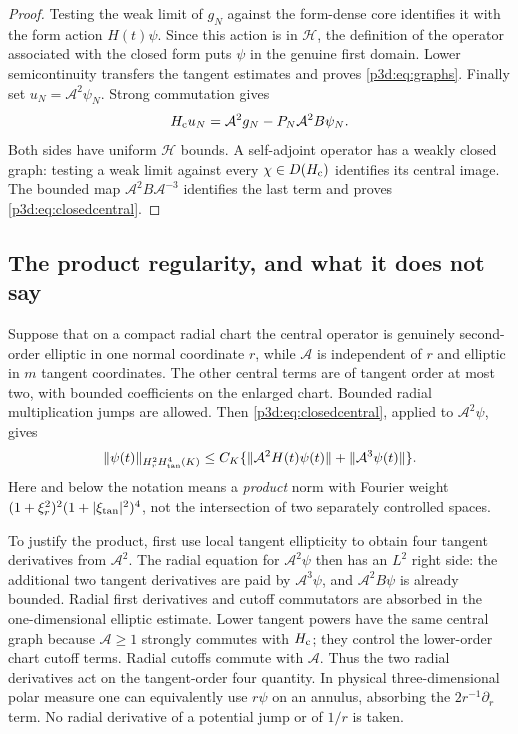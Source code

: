 \documentclass[11pt]{article}
\numberwithin{equation}{section}
\theoremstyle{definition}
\theoremstyle{remark}
\begin{document}
\begin{proof}
Testing the weak limit of $g_N$ against the form-dense core identifies
it with the form action $H(t)\psi$. Since this action is in
$\mathcal H$, the definition of the operator associated with the
closed form puts $\psi$ in the genuine first domain. Lower
semicontinuity transfers the tangent estimates and proves
\eqref{p3d:eq:graphs}.
Finally set $u_N=\mathcal A^2\psi_N$. Strong commutation gives
\[
 H_{\rm c}u_N=\mathcal A^2g_N-P_N\mathcal A^2B\psi_N.
\]
Both sides have uniform $\mathcal H$ bounds. A self-adjoint operator
has a weakly closed graph: testing a weak limit against every
$\chi\in D(H_{\rm c})$ identifies its central image. The bounded map
$\mathcal A^2B\mathcal A^{-3}$ identifies the last term and proves
\eqref{p3d:eq:closedcentral}.
\end{proof}

\subsection{The product regularity, and what it does not say}

Suppose that on a compact radial chart the central operator is genuinely
second-order elliptic in one normal coordinate $r$, while
$\mathcal A$ is independent of $r$ and elliptic in $m$ tangent coordinates.
The other central terms are of tangent order at most two, with bounded
coefficients on the enlarged chart. Bounded radial multiplication jumps
are allowed. Then \eqref{p3d:eq:closedcentral}, applied to
$\mathcal A^2\psi$, gives
\begin{equation}\label{p3d:eq:product}
 \|\psi(t)\|_{H^2_rH^4_{\rm tan}(K)}
 \leq C_K\{\|\mathcal A^2H(t)\psi(t)\|
                         +\|\mathcal A^3\psi(t)\|\}.
\end{equation}
Here and below the notation means a \emph{product} norm with Fourier
weight $(1+\xi_r^2)^2(1+|\xi_{\rm tan}|^2)^4$, not the intersection of
two separately controlled spaces.

To justify the product, first use local tangent ellipticity to obtain
four tangent derivatives from $\mathcal A^2$. The radial equation for
$\mathcal A^2\psi$ then has an $L^2$ right side: the additional two
tangent derivatives are paid by $\mathcal A^3\psi$, and
$\mathcal A^2B\psi$ is already bounded. Radial first derivatives and
cutoff commutators are absorbed in the one-dimensional elliptic estimate.
Lower tangent powers have the same central graph because
$\mathcal A\geq1$ strongly commutes with $H_{\rm c}$; they control the
lower-order chart cutoff terms. Radial cutoffs commute with
$\mathcal A$. Thus the two radial derivatives act on the tangent-order
four quantity. In physical three-dimensional polar measure one can
equivalently use $r\psi$ on an annulus, absorbing the $2r^{-1}\partial_r$
term. No radial derivative of a potential jump or of $1/r$ is taken.
\end{document}
